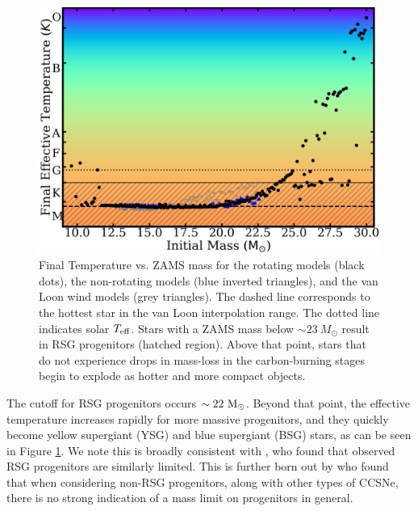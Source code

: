 \documentclass[twocolumn]{aastex631}
\begin{document}
\begin{figure}[hbt!]
    \centering
    \includegraphics[scale=0.15]{finalteff_mass.png}
    \caption{Final Temperature vs. ZAMS mass for the rotating models (black dots), the non-rotating models (blue inverted triangles), and the van Loon wind models (grey triangles). The dashed line corresponds to the hottest star in the van Loon interpolation range. The dotted line indicates solar $T_{\rm eff}$. Stars with a ZAMS mass below $\sim 23\ M_{\odot}$ result in RSG progenitors (hatched region). Above that point, stars that do not experience drops in mass-loss in the carbon-burning stages begin to explode as hotter and more compact objects.}
    \label{fig:specf}
\end{figure}


The cutoff for RSG progenitors occurs $\sim 22~ \rm M_{\odot}$.  Beyond that point, the effective temperature increases rapidly for more massive progenitors, and they quickly become yellow supergiant (YSG) and blue supergiant (BSG) stars, as can be seen in Figure \ref{fig:specf}. We note this is broadly consistent with \citet{katsuda}, who found that observed RSG progenitors are similarly limited. This is further born out by \citet{davies} who found that when considering non-RSG progenitors, along with other types of CCSNe, there is no strong indication of a mass limit on progenitors in general.
\end{document}
